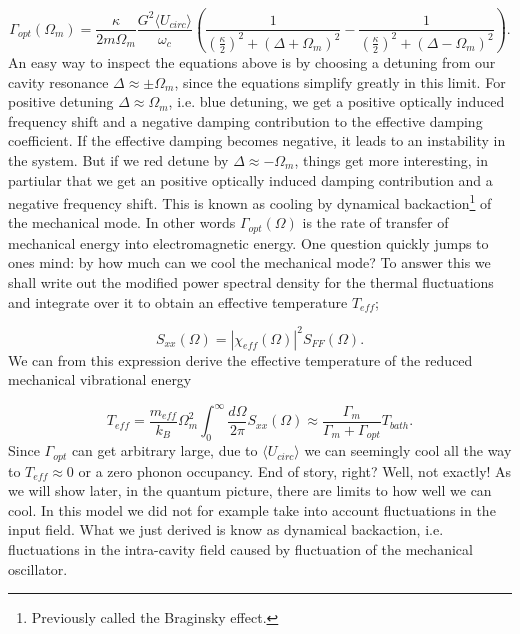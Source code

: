 \begin{equation}
\Gamma_{opt}(\Omega_m) = \frac{\kappa}{2m\Omega_m}\frac{G^2\langle U_{circ} \rangle}{\omega_c}\left( \frac{1}{\left(\frac{\kappa}{2}\right)^2 + (\Delta + \Omega_m)^2} - \frac{1}{\left(\frac{\kappa}{2}\right)^2 + (\Delta - \Omega_m)^2} \right).
\label{eq:gamma_opt}
\end{equation}
\noindent
An easy way to inspect the equations above is by choosing a detuning from our cavity resonance $\Delta \approx \pm \Omega_m$, since the equations simplify greatly in this limit. For positive detuning $\Delta \approx \Omega_m$, i.e. blue detuning, we get a positive optically induced frequency shift and a negative damping contribution to the effective damping coefficient. If the effective damping becomes negative, it leads to an instability in the system. But if we red detune by $\Delta \approx -\Omega_m$, things get more interesting, in partiular that we get an positive optically induced damping contribution and a negative frequency shift. This is known as cooling by dynamical backaction\footnote{Previously called the Braginsky effect.} of the mechanical mode. In other words $\Gamma_{opt}(\Omega)$ is the rate of transfer of mechanical energy into electromagnetic energy. One question quickly jumps to ones mind: by how much can we cool the mechanical mode? To answer this we shall write out the modified power spectral density for the thermal fluctuations and integrate over it to obtain an effective temperature $T_{eff}$;

\begin{equation}
S_{xx}(\Omega) = \left| \chi_{eff}(\Omega) \right|^2S_{FF}(\Omega).
\end{equation}
\noindent
We can from this expression derive the effective temperature of the reduced mechanical vibrational energy

\begin{equation}
T_{eff} = \frac{m_{eff}}{k_B}\Omega_m^2\int_0^\infty \frac{d\Omega}{2\pi}S_{xx}(\Omega) \approx \frac{\Gamma_m}{\Gamma_m + \Gamma_{opt}}T_{bath}.
\end{equation}
\noindent
Since $\Gamma_{opt}$ can get arbitrary large, due to $\langle U_{circ} \rangle$ we can seemingly cool all the way to $T_{eff} \approx 0$ or a zero phonon occupancy. End of story, right? Well, not exactly! As we will show later, in the quantum picture, there are limits to how well we can cool. In this model we did not for example take into account fluctuations in the input field. What we just derived is know as dynamical backaction, i.e. fluctuations in the intra-cavity field caused by fluctuation of the mechanical oscillator.